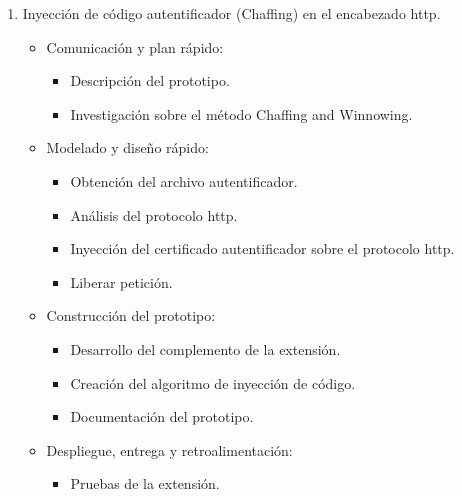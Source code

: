 \documentclass[12pt, a4paper, titlepage]{report}
\begin{document}
\begin{enumerate}
            
            \item Inyección de código autentificador (Chaffing) en el encabezado \acrshort{http}. 
            \begin{itemize}
                \item Comunicación y plan rápido: 
                \begin{itemize}
                    \item Descripción del prototipo.
                    \item Investigación sobre el método Chaffing and Winnowing. 
                \end{itemize}
                \item Modelado y diseño rápido: 
                \begin{itemize}
                    \item  Obtención del archivo autentificador.
                    \item  Análisis del protocolo \acrshort{http}.
                    \item  Inyección del certificado autentificador sobre el protocolo \acrshort{http}.
                    \item Liberar petición.
                \end{itemize}
                \item Construcción del prototipo:
                \begin{itemize}
                    \item Desarrollo del complemento de la extensión. 
                    \item Creación del algoritmo de inyección de código. 
                    \item Documentación del prototipo. 
                \end{itemize}
                \item Despliegue, entrega y retroalimentación: 
                \begin{itemize}
                    \item Pruebas de la extensión. 
                \end{itemize}
            \end{itemize}
            

\end{enumerate}
\end{document}
